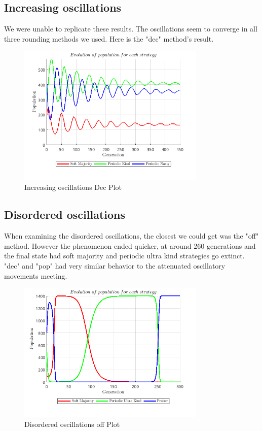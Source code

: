 \subsection{Increasing oscillations}
We were unable to replicate these results. The oscillations seem to converge in all three rounding methods we used. Here is the "dec" method's result.
\begin{figure}[H]
    \centering
    \includegraphics[width=0.8\textwidth]{media/meetings/increasing_oscillations_dec.png}
    \caption{Increasing oscillations Dec Plot}
\end{figure}

\subsection{Disordered oscillations}
When examining the disordered oscillations, the closest we could get was the "off" method. However the phenomenon ended quicker, at around 260 generations and the final state had soft majority and periodic ultra kind strategies go extinct. "dec" and "pop" had very similar behavior to the attenuated oscillatory movements meeting.
\begin{figure}[H]
    \centering
    \includegraphics[width=0.8\textwidth]{media/meetings/disordered_oscillations_off.png}
    \caption{Disordered oscillations off Plot}
\end{figure}

